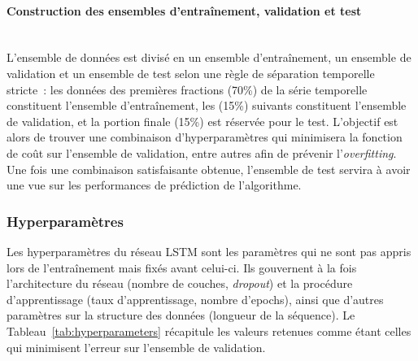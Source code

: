 \paragraph{Construction des ensembles d'entraînement, validation et test}\hfill \\
L'ensemble de données est divisé en un ensemble d'entraînement, un ensemble de validation et un ensemble de test selon une règle de séparation temporelle stricte~: les données des premières fractions (70\%) de la série temporelle constituent l'ensemble d'entraînement, les (15\%) suivants constituent l'ensemble de validation, et la portion finale (15\%) est réservée pour le test. L'objectif est alors de trouver une combinaison d'hyperparamètres qui minimisera la fonction de coût sur l'ensemble de validation, entre autres afin de prévenir l'\textit{overfitting}. Une fois une combinaison satisfaisante obtenue, l'ensemble de test servira à avoir une vue sur les performances de prédiction de l'algorithme.

\subsubsection{Hyperparamètres}

Les hyperparamètres du réseau LSTM sont les paramètres qui ne sont pas appris lors de l'entraînement mais fixés avant celui-ci. Ils gouvernent à la fois l'architecture du réseau (nombre de couches, \textit{dropout}) et la procédure d'apprentissage (taux d'apprentissage, nombre d'epochs), ainsi que d'autres paramètres sur la structure des données (longueur de la séquence). Le Tableau~\ref{tab:hyperparameters} récapitule les valeurs retenues comme étant celles qui minimisent l'erreur sur l'ensemble de validation.

